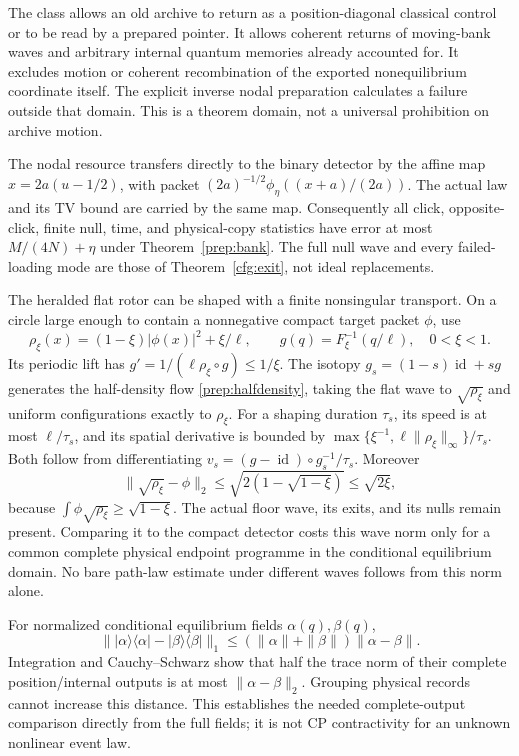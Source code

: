 \documentclass[11pt,oneside,openany]{book}
\theoremstyle{definition}
\theoremstyle{remark}\newtheorem{remark}[theorem]{Remark}
\begin{document}
The class allows an old archive to return as a position-diagonal classical
control or to be read by a prepared pointer. It allows coherent returns
of moving-bank waves and arbitrary internal quantum memories already
accounted for. It excludes motion or coherent recombination of the exported
nonequilibrium coordinate itself. The explicit inverse nodal preparation
calculates a failure outside that domain. This is a theorem domain, not
a universal prohibition on archive motion.

The nodal resource transfers directly to the binary detector by the affine
map $x=2a(u-1/2)$, with packet
$(2a)^{-1/2}\phi_\eta((x+a)/(2a))$.
The actual law and its TV bound are carried by the same map.
Consequently all click, opposite-click, finite null, time, and physical-copy
statistics have error at most $M/(4N)+\eta$ under
Theorem~\ref{prep:bank}. The full null wave and every failed-loading mode
are those of Theorem~\ref{cfg:exit}, not ideal replacements.

The heralded flat rotor can be shaped with a finite nonsingular transport.
On a circle large enough to contain a nonnegative compact target packet
$\phi$, use
\[
 \rho_\xi(x)=(1-\xi)|\phi(x)|^2+\xi/\ell,\qquad
 g(q)=F_\xi^{-1}(q/\ell),\quad 0<\xi<1.
\]
Its periodic lift has
$g'=1/(\ell\rho_\xi\circ g)\le1/\xi$.
The isotopy $g_s=(1-s)\operatorname{id}+sg$ generates the
half-density flow \eqref{prep:halfdensity}, taking the flat wave to
$\sqrt{\rho_\xi}$ and uniform configurations exactly to $\rho_\xi$.
For a shaping duration $\tau_s$, its speed is at most $\ell/\tau_s$,
and its spatial derivative is bounded by
$\max\{\xi^{-1},\ell\|\rho_\xi\|_\infty\}/\tau_s$.
Both follow from differentiating
$v_s=(g-\operatorname{id})\circ g_s^{-1}/\tau_s$.
Moreover
\[
 \|\sqrt{\rho_\xi}-\phi\|_2
 \le\sqrt{2(1-\sqrt{1-\xi})}\le\sqrt{2\xi},
\]
because $\int\phi\sqrt{\rho_\xi}\ge\sqrt{1-\xi}$.
The actual floor wave, its exits, and its nulls remain present. Comparing
it to the compact detector costs this wave norm only for a common complete
physical endpoint programme in the conditional equilibrium domain.
No bare path-law estimate under different waves follows from this norm alone.

For normalized conditional equilibrium fields $\alpha(q),\beta(q)$,
\[
 \bigl\||\alpha\rangle\langle\alpha|
       -|\beta\rangle\langle\beta|\bigr\|_1
 \le(\|\alpha\|+\|\beta\|)\|\alpha-\beta\|.
\]
Integration and Cauchy--Schwarz show that half the trace norm of their
complete position/internal outputs is at most $\|\alpha-\beta\|_2$.
Grouping physical records cannot increase this distance.
This establishes the needed complete-output comparison directly from the
full fields; it is not CP contractivity for an unknown nonlinear event law.
\end{document}
